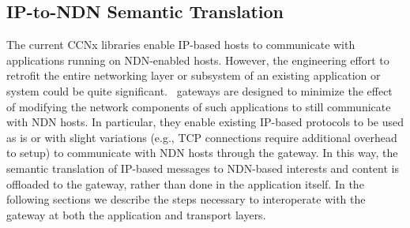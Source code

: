 \subsection{IP-to-NDN Semantic Translation}
The current CCNx libraries enable IP-based hosts to communicate with applications running on NDN-enabled hosts. However, the engineering effort to retrofit the entire networking layer or subsystem of an existing application or system could be quite significant. \sink\ gateways are designed to minimize the effect of modifying the network components of such applications to still communicate with NDN hosts. In particular, they enable existing IP-based protocols to be used as is or with slight variations (e.g., TCP connections require additional overhead to setup) to communicate with NDN hosts through the gateway. In this way, the semantic translation of IP-based messages to NDN-based interests and content is offloaded to the gateway, rather than done in the application itself. In the following sections we describe the steps necessary to interoperate with the gateway at both the application and transport layers.


